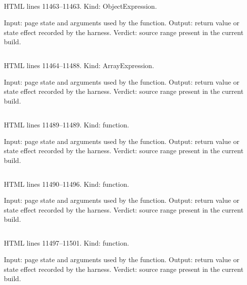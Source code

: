 \subsection*{\texttt{}}
\label{vf_632_CMD}
HTML lines 11463--11463. Kind: ObjectExpression.

Input: page state and arguments used by the function.
Output: return value or state effect recorded by the harness.
Verdict: source range present in the current build.

\subsection*{\texttt{}}
\label{vf_633_CMD_HELP}
HTML lines 11464--11488. Kind: ArrayExpression.

Input: page state and arguments used by the function.
Output: return value or state effect recorded by the harness.
Verdict: source range present in the current build.

\subsection*{\texttt{}}
\label{vf_634_cmdEl}
HTML lines 11489--11489. Kind: function.

Input: page state and arguments used by the function.
Output: return value or state effect recorded by the harness.
Verdict: source range present in the current build.

\subsection*{\texttt{}}
\label{vf_635_cmdPrint}
HTML lines 11490--11496. Kind: function.

Input: page state and arguments used by the function.
Output: return value or state effect recorded by the harness.
Verdict: source range present in the current build.

\subsection*{\texttt{}}
\label{vf_636_cmdTable}
HTML lines 11497--11501. Kind: function.

Input: page state and arguments used by the function.
Output: return value or state effect recorded by the harness.
Verdict: source range present in the current build.

